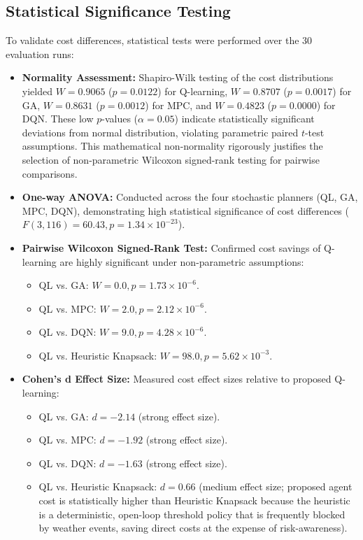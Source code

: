 \documentclass[review,3p,times,authoryear]{elsarticle}
\begin{document}
\subsection{Statistical Significance Testing}
To validate cost differences, statistical tests were performed over the 30 evaluation runs:
\begin{itemize}
    \item \textbf{Normality Assessment:} Shapiro-Wilk testing of the cost distributions yielded $W=0.9065$ ($p=0.0122$) for Q-learning, $W=0.8707$ ($p=0.0017$) for GA, $W=0.8631$ ($p=0.0012$) for MPC, and $W=0.4823$ ($p=0.0000$) for DQN. These low $p$-values ($\alpha=0.05$) indicate statistically significant deviations from normal distribution, violating parametric paired $t$-test assumptions. This mathematical non-normality rigorously justifies the selection of non-parametric Wilcoxon signed-rank testing for pairwise comparisons.
    \item \textbf{One-way ANOVA:} Conducted across the four stochastic planners (QL, GA, MPC, DQN), demonstrating high statistical significance of cost differences ($F(3, 116) = \mathbf{60.43}, p = 1.34 \times 10^{-23}$).
    \item \textbf{Pairwise Wilcoxon Signed-Rank Test:} Confirmed cost savings of Q-learning are highly significant under non-parametric assumptions:
    \begin{itemize}
        \item QL vs. GA: $W = \mathbf{0.0}, p = 1.73 \times 10^{-6}$.
        \item QL vs. MPC: $W = \mathbf{2.0}, p = 2.12 \times 10^{-6}$.
        \item QL vs. DQN: $W = \mathbf{9.0}, p = 4.28 \times 10^{-6}$.
        \item QL vs. Heuristic Knapsack: $W = \mathbf{98.0}, p = 5.62 \times 10^{-3}$.
    \end{itemize}
    \item \textbf{Cohen's d Effect Size:} Measured cost effect sizes relative to proposed Q-learning:
    \begin{itemize}
        \item QL vs. GA: $d = \mathbf{-2.14}$ (strong effect size).
        \item QL vs. MPC: $d = \mathbf{-1.92}$ (strong effect size).
        \item QL vs. DQN: $d = \mathbf{-1.63}$ (strong effect size).
        \item QL vs. Heuristic Knapsack: $d = \mathbf{0.66}$ (medium effect size; proposed agent cost is statistically higher than Heuristic Knapsack because the heuristic is a deterministic, open-loop threshold policy that is frequently blocked by weather events, saving direct costs at the expense of risk-awareness).

\end{itemize}
\end{itemize}
\end{document}

